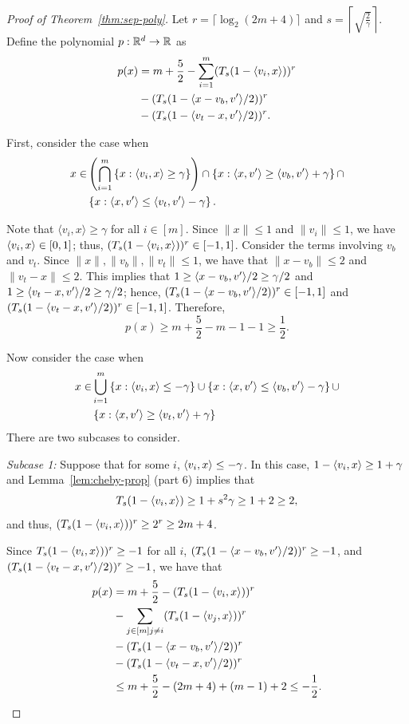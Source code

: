 \begin{proof}[Proof of Theorem~\ref{thm:sep-poly}]
Let $r=\lceil\log_2(2m+4)\rceil$ and $s=\left\lceil\sqrt{\frac{2}{\gamma}}\right\rceil$.
Define the polynomial $p:{\mathbb{R}}^d\to {\mathbb{R}}$ as
\begin{align*}
    p(x) &= m+\frac{5}{2}-\sum_{i=1}^m (T_s(1-\langle v_i,x\rangle))^r \\
    &-(T_s(1-\langle x-v_b,v'\rangle/2))^r \\
    &-(T_s(1-\langle v_t-x,v'\rangle/2))^r.
\end{align*}

First, consider the case when
\begin{align*}
  x \in & \left(\bigcap_{i=1}^m \left\{x: \langle v_i,x\rangle\geq \gamma\right\}\right) \cap \left\{x: \langle x,v'\rangle \geq \langle v_b,v'\rangle+\gamma\right\} \cap \\
  & \left\{x: \langle x,v'\rangle \leq \langle v_t,v'\rangle-\gamma\right\}.
\end{align*}

Note that $\langle v_i, x\rangle \geq \gamma$ for all $i\in [m]$.
Since $\|x\|\leq 1$ and $\|v_i\|\leq 1$, we have $\langle v_i,x\rangle \in [0,1]$; 
thus, $(T_s(1-\langle v_i,x\rangle))^r \in [-1,1]$.
Consider the terms involving $v_b$ and $v_t$.  Since $\|x\|,\|v_b\|,\|v_t\|\leq 1$, we have that $\|x-v_b\|\leq 2$ and $\|v_t-x\|\leq 2$.  This implies that
$1\geq\langle x-v_b,v'\rangle/2\geq\gamma/2$ and $1\geq\langle v_t-x,v'\rangle/2\geq\gamma/2$; hence,
$(T_s(1-\langle x-v_b,v'\rangle/2))^r\in [-1,1]$ and $(T_s(1-\langle v_t-x,v'\rangle/2))^r\in[-1,1]$.
Therefore,
\[
p(x)\geq m+\frac{5}{2}-m-1-1\geq \frac{1}{2}.
\]

Now consider the case when
\begin{align*}
  x  \in & \bigcup_{i=1}^m \left\{x:\langle v_i,x\rangle\leq -\gamma\right\} \cup \left\{x:\langle x,v'\rangle \leq \langle v_b,v'\rangle-\gamma\right\} \cup \\
  & \left\{x:\langle x,v'\rangle \geq \langle v_t,v'\rangle+\gamma\right\}
\end{align*}
There are two subcases to consider.

{\em Subcase 1:} Suppose that for some $i$, $\langle v_i,x\rangle\leq-\gamma$.  
In this case, $1-\langle v_i,x\rangle\geq 1+\gamma$ and
Lemma~\ref{lem:cheby-prop} (part 6) implies that
\[
  T_s(1-\langle v_i,x\rangle) \geq 1+s^2\gamma \geq 1+2 \geq 2,
\]
and thus, $(T_s(1-\langle v_i,x\rangle))^r\geq 2^r\geq 2m+4$.

Since $T_s(1-\langle v_i,x\rangle))^r \geq -1$ for all $i$, 
$(T_s(1-\langle x-v_b,v'\rangle/2))^r\geq -1$, and $(T_s(1-\langle v_t-x,v'\rangle/2))^r\geq -1$, 
we have that
\begin{align*}
    p(x)&=m+\frac{5}{2}-(T_s(1-\langle v_i,x\rangle))^r \\
    &-\sum_{j\in [m]j\neq i} (T_s(1-\langle v_j,x\rangle))^r \\
    &-(T_s(1-\langle x-v_b,v'\rangle/2))^r \\
    &-(T_s(1-\langle v_t-x,v'\rangle/2))^r \\
    &\leq m+\frac{5}{2}-(2m+4)+(m-1)+2 \leq -\frac{1}{2}.
\end{align*}


\end{proof}
